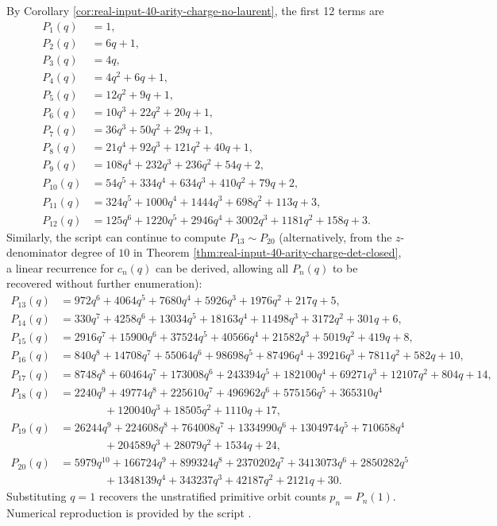 By Corollary \ref{cor:real-input-40-arity-charge-no-laurent}, the first 12 terms are
\[
\begin{aligned}
P_1(q)&=1,\\
P_2(q)&=6q+1,\\
P_3(q)&=4q,\\
P_4(q)&=4q^2+6q+1,\\
P_5(q)&=12q^2+9q+1,\\
P_6(q)&=10q^3+22q^2+20q+1,\\
P_7(q)&=36q^3+50q^2+29q+1,\\
P_8(q)&=21q^4+92q^3+121q^2+40q+1,\\
P_9(q)&=108q^4+232q^3+236q^2+54q+2,\\
P_{10}(q)&=54q^5+334q^4+634q^3+410q^2+79q+2,\\
P_{11}(q)&=324q^5+1000q^4+1444q^3+698q^2+113q+3,\\
P_{12}(q)&=125q^6+1220q^5+2946q^4+3002q^3+1181q^2+158q+3.
\end{aligned}
\]
Similarly, the script can continue to compute $P_{13}\sim P_{20}$ (alternatively, from the $z$-denominator degree of $10$ in Theorem \ref{thm:real-input-40-arity-charge-det-closed}, a linear recurrence for $c_n(q)$ can be derived, allowing all $P_n(q)$ to be recovered without further enumeration):
\[
\begin{aligned}
P_{13}(q)&=972q^6+4064q^5+7680q^4+5926q^3+1976q^2+217q+5,\\
P_{14}(q)&=330q^7+4258q^6+13034q^5+18163q^4+11498q^3+3172q^2+301q+6,\\
P_{15}(q)&=2916q^7+15900q^6+37524q^5+40566q^4+21582q^3+5019q^2+419q+8,\\
P_{16}(q)&=840q^8+14708q^7+55064q^6+98698q^5+87496q^4+39216q^3+7811q^2+582q+10,\\
P_{17}(q)&=8748q^8+60464q^7+173008q^6+243394q^5+182100q^4+69271q^3+12107q^2+804q+14,\\
P_{18}(q)&=2240q^9+49774q^8+225610q^7+496962q^6+575156q^5+365310q^4\\
&\qquad\qquad+120040q^3+18505q^2+1110q+17,\\
P_{19}(q)&=26244q^9+224608q^8+764008q^7+1334990q^6+1304974q^5+710658q^4\\
&\qquad\qquad+204589q^3+28079q^2+1534q+24,\\
P_{20}(q)&=5979q^{10}+166724q^9+899324q^8+2370202q^7+3413073q^6+2850282q^5\\
&\qquad\qquad+1348139q^4+343237q^3+42187q^2+2121q+30.
\end{aligned}
\]
Substituting $q=1$ recovers the unstratified primitive orbit counts $p_n=P_n(1)$. Numerical reproduction is provided by the script
.

